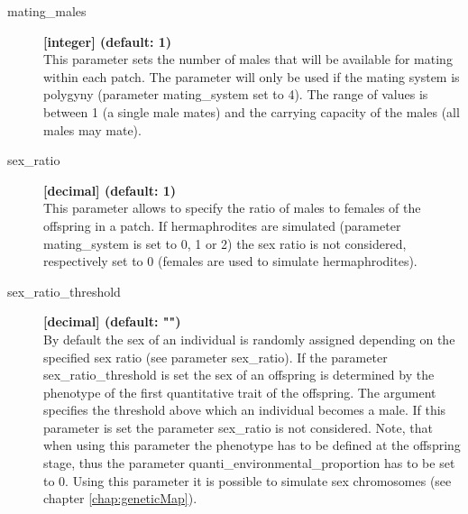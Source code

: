 \documentclass[letterpaper,12pt,oneside]{book}
\begin{document}
\begin{description}
\item[mating\_males] \textbf{[integer] (default: 1)}\\
This parameter sets the number of males that will be available for mating within each patch. The parameter will only be used if the mating system is polygyny (parameter \textsf{mating\_system} set to 4). The range of values is between 1 (a single male mates) and the carrying capacity of the males (all males may mate).

\item[sex\_ratio] \textbf{[decimal] (default: 1)}\\
This parameter allows to specify the ratio of males to females of the offspring in a patch. If hermaphrodites are simulated (parameter \textsf{mating\_system} is set to 0, 1 or 2) the sex ratio is not considered, respectively set to 0 (females are used to simulate hermaphrodites).

\item[sex\_ratio\_threshold] \textbf{[decimal] (default: "")}\\
By default the sex of an individual is randomly assigned depending on the specified sex ratio (see parameter \textsf{sex\_ratio}). If the parameter \textsf{sex\_ratio\_threshold} is set the sex of an offspring is determined by the phenotype of the first quantitative trait of the offspring. The argument specifies the threshold above which an individual becomes a male. If this parameter is set the parameter \textsf{sex\_ratio} is not considered. Note, that when using this parameter the phenotype has to be defined at the offspring stage, thus the parameter \textsf{quanti\_environmental\_proportion} has to be set to 0. Using this parameter it is possible to simulate sex chromosomes (see chapter \ref{chap:geneticMap}).  

\end{description}

\newpage
\end{document}
